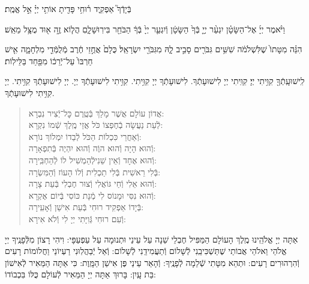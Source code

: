 \documentclass[twoside, openany, parskip=half, 11pt]{book}
\begin{document}
בְּֿיָדְֿךָ֮ אַפְקִ֢יד ר֫וּחִ֥י פָּדִ֖יתָ אוֹתִ֥י יְיָ֗ אֵ֣ל אֱמֶֽת׃

וַיֹּ֨אמֶר יְיָ֜ אֶל־הַשָּׂטָ֗ן יִגְעַ֨ר יְיָ֤ בְּֿךָ֙ הַשָּׂטָ֔ן וְֿיִגְעַ֤ר יְיָ֙ בְּֿךָ֔ הַבֹּחֵ֖ר בִּירֽוּשָׁלָ֑םִ הֲל֧וֹא זֶ֦ה א֖וּד מֻצָּ֥ל מֵאֵֽשׁ׃

הִנֵּ֗ה מִטָּתוֹ֙ שֶׁלִּשְׁלֹמֹ֔ה שִׁשִּׁ֥ים גִּבֹּרִ֖ים סָבִ֣יב לָ֑הּ מִגִּבֹּרֵ֖י יִשְׂרָאֵֽל׃ כֻּלָם֙ אֲחֻ֣זֵי חֶ֔רֶב מְֿלֻמְּֿדֵ֖י מִלְחָמָ֑ה אִ֤ישׁ חַרְבּוֹ֙ עַל־יְֿרֵכ֔וֹ מִפַּ֖חַד בַּלֵּילֽוֹת׃


לִֽישׁוּעָֽתְֿךָ֖ קִוִּ֥יתִי יְיָ׃ קִוִּֽיתִי יְיָ לִישׁוּעָתְֿךָ. לִישׁוּעָתְֿךָ יְיָ קִוִּ֥יתִי. קִוִּ֥יתִי לִישׁוּעָתְֿךָ יְיָ. יְיָ לִישׁוּעָתְֿךָ קִוִּ֥יתִי. יְיָ קִוִּ֥יתִי לִישׁוּעָתְֿךָ.

\vspace{-\baselineskip}
\begin{quote}

אֲדוֹן עוֹלָם אֲשֶׁר מָלַךְ \hfill בְּֿטֶֽרֶם כׇּל־יְֿצִיר נִבְרָא:\\
לְֿעֵת נַעֲשָׂה בְֿחֶפְצוֹ כֹּל \hfill אֲזַי מֶֽלֶךְ שְֿׁמוֹ נִקְרָא:\\
וְֿאַחֲרֵי כִּכְלוֹת הַכֹּל \hfill לְֿבַדוֹ יִמְלוֹךְ נוֹרָא:\\
וְֿהוּא הָיָה וְֿהוּא הוֶֹה \hfill וְֿהוּא יִהְיֶה בְּֿתִפְאָרָה:\\
וְֿהוּא אֶחָד וְֿאֵין שֵׁנִי\hfill לְֿהַמְשִׁיל לוֹ לְֿהַחְבִּֽירָה:\\
בְּֿלִי רֵאשִׁית בְּֿלִי תַכְלִית \hfill וְֿלוֹ הָעוֹז וְֿהַמִּשְׂרָה:\\
וְֿהוּא אֵלִי וְֿחַי גּוֹאֲלִי \hfill וְֿצוּר חֶבְלִי בְּֿעֵת צָרָה:\\
וְֿהוּא נִסִּי וּמָנוֹס לִי \hfill מְֿנָת כּוֹסִי בְּֿיוֹם אֶקְרָא:\\
בְּֿיָדוֹ אַפְקִיד רוּחִי \hfill בְּֿעֵת אִישַׁן וְֿאָעִֽירָה:\\
וְֿעִם רוּחִי גְּֿוִיָּתִי \hfill יְיָ לִי וְֿלֹא אִירָא:

\end{quote}


אַתָּה יְיָ אֱלֹהֵֽינוּ מֶֽלֶךְ הָעוֹלָם הַמַּפִּיל חֶבְלֵי שֵׁנָה עַל עֵינַי וּתְנוּמָה עַל עַפְעַפָּי: וִיהִי רָצוֹן מִלְּֿפָנֶֽיךָ יְיָ אֱלֹהַי וֵאלֹהֵי אֲבוֹתַי שֶׁתַּשְׁכִּיבֵֽנִי לְֿשָׁלוֹם וְֿתַעֲמִידֵֽנִי לְֿשָׁלוֹם: וְֿאַל יְֿבַהֲלֽוּנִי רַעְיוֹנַי וַחֲלוֹמוֹת רָעִים וְֿהִרְהוּרִים רָעִים: וּתְהֵא מִטָּתִי שְֿׁלֵמָה לְֿפָנֶֽיךָ: וְֿהָאֵר עֵינַי פֶּן אִישַׁן הַמָּֽוֶת: כִּי אַתָּה הַמֵּאִיר לְֿאִישׁוֹן בַּת עָֽיִן: בָּרוּךְ אַתָּה יְיָ הַמֵּאִיר לְֿעוֹלָם כֻּלּוֹ בִּכְבוֹדוֹ:

\vfill
\end{document}
